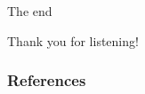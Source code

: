 \begin{frame}[c]{The end}
\begin{center}
    \color{vubbleu} \LARGE\vubfont Thank you for listening!
\end{center}
\end{frame}

\begin{frame}[allowframebreaks]
\frametitle{References}
\footnotesize{


}
\end{frame}


